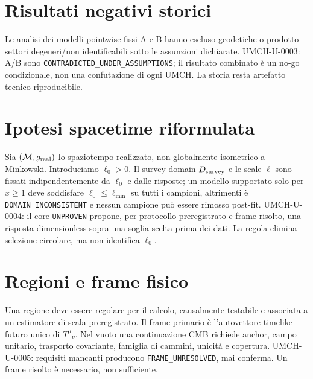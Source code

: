 \documentclass[11pt,a4paper]{article}
\begin{document}
\section{Risultati negativi storici}\label{sec:u-negative-history}
Le analisi dei modelli pointwise fissi A e B hanno escluso geodetiche o prodotto settori degeneri/non identificabili sotto le assunzioni dichiarate. UMCH-U-0003: A/B sono \verb|CONTRADICTED_UNDER_ASSUMPTIONS|; il risultato combinato è un no-go condizionale, non una confutazione di ogni UMCH. La storia resta artefatto tecnico riproducibile.

\section{Ipotesi spacetime riformulata}\label{sec:u-hypothesis}
Sia $(\mathcal M,g_{\rm real})$ lo spaziotempo realizzato, non globalmente isometrico a Minkowski. Introduciamo $\ell_0>0$. Il survey domain $D_{\rm survey}$ e le scale $\ell$ sono fissati indipendentemente da $\ell_0$ e dalle risposte; un modello supportato solo per $x\geq1$ deve soddisfare $\ell_0\leq\ell_{\min}$ su tutti i campioni, altrimenti è \verb|DOMAIN_INCONSISTENT| e nessun campione può essere rimosso post-fit. UMCH-U-0004: il core \verb|UNPROVEN| propone, per protocollo preregistrato e frame risolto, una risposta dimensionless sopra una soglia scelta prima dei dati. La regola elimina selezione circolare, ma non identifica $\ell_0$.

\section{Regioni e frame fisico}\label{sec:u-frame}
Una regione deve essere regolare per il calcolo, causalmente testabile e associata a un estimatore di scala preregistrato. Il frame primario è l'autovettore timelike futuro unico di $T^\mu{}_{\nu}$. Nel vuoto una continuazione CMB richiede anchor, campo unitario, trasporto covariante, famiglia di cammini, unicità e copertura. UMCH-U-0005: requisiti mancanti producono \verb|FRAME_UNRESOLVED|, mai conferma. Un frame risolto è necessario, non sufficiente.
\end{document}
